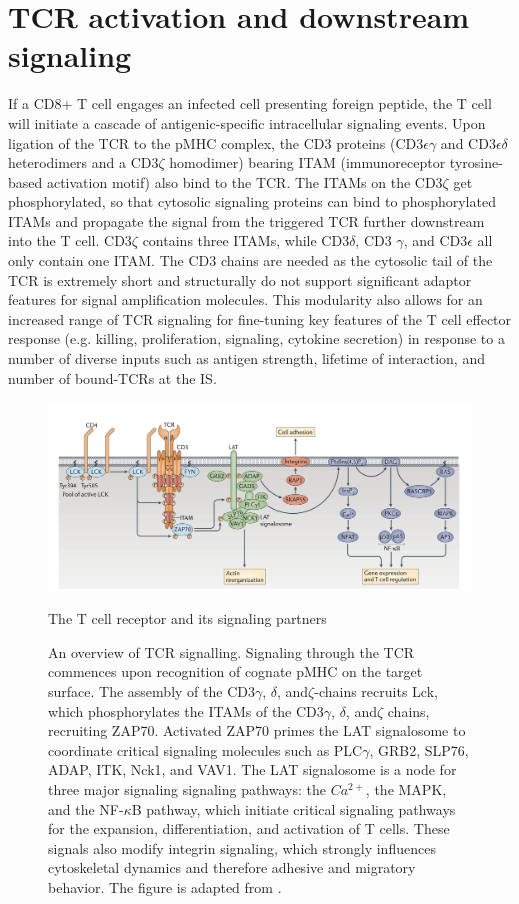 \section{TCR activation and downstream signaling}
	\label{TCR activation and downstream signaling}
If a CD8+ T cell engages an infected cell presenting foreign peptide, the T cell will initiate a cascade of antigenic-specific intracellular signaling events. Upon ligation of the TCR to the pMHC complex, the CD3 proteins (CD3$\epsilon \gamma$ and CD3$\epsilon \delta$ heterodimers and a CD3$\zeta$ homodimer) bearing ITAM (immunoreceptor tyrosine-based activation motif) also bind to the TCR.  The ITAMs on the CD3$\zeta$ get phosphorylated, so that cytosolic signaling proteins can bind to phosphorylated ITAMs and propagate the signal from the triggered TCR further downstream into the T cell. CD3$\zeta$ contains three ITAMs, while CD3$\delta$, CD3 $\gamma$, and CD3$\epsilon$ all only contain one ITAM. The CD3 chains are needed as the cytosolic tail of the TCR is extremely short and structurally do not support significant adaptor features for signal amplification molecules. This modularity also allows for an increased range of TCR signaling for fine-tuning key features of the T cell effector response (e.g. killing, proliferation, signaling, cytokine secretion) in response to a number of diverse inputs such as antigen strength, lifetime of interaction, and number of bound-TCRs at the IS.

\begin{figure}[htbp]
	\centering
	\includegraphics[width=\textwidth]{../figures/chapter1/tcrsignaling.png}
	\caption{The T cell receptor and its signaling partners}
	\caption*{An overview of TCR signalling.  Signaling through the TCR commences upon recognition of cognate pMHC on the target surface. The assembly of the CD3$\gamma$, $\delta$,  and$\zeta$-chains recruits Lck, which phosphorylates the ITAMs of the CD3$\gamma$, $\delta$,  and$\zeta$ chains, recruiting ZAP70.  Activated ZAP70 primes the LAT signalosome to coordinate critical signaling molecules such as PLC$\gamma$, GRB2, SLP76, ADAP, ITK, Nck1, and VAV1.  The LAT signalosome is a node for three major signaling signaling pathways: the $Ca^{2+}$, the MAPK, and the NF-$\kappa$B pathway, which initiate critical signaling pathways for the expansion, differentiation, and activation of T cells. These signals also modify integrin signaling, which strongly influences cytoskeletal dynamics and therefore adhesive and migratory behavior.  The figure is adapted from \cite{Brownlie2013}.}
	\label{fig:tcrsignaling}
\end{figure}

